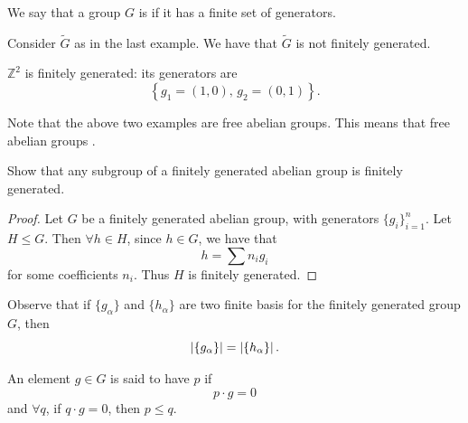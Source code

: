\documentclass[notoc,notitlepage]{tufte-book}
\begin{document}
\begin{defn}\label{defn:finitely_generated}
  We say that a group $G$ is  if it has a finite set
  of generators.
\end{defn}

\begin{eg}
  Consider $\tilde{G}$ as in the last example. We have that $\tilde{G}$ is not
  finitely generated.
\end{eg}

\begin{eg}
  $\mathbb{Z}^2$ is finitely generated: its generators are
  \begin{equation*}
    \left\{ g_1 = (1, 0),\,g_2 = (0, 1) \right\}.
  \end{equation*}
\end{eg}

\begin{note}
  Note that the above two examples are free abelian groups. This means that free
  abelian groups .
\end{note}

\begin{ex}
  Show that any subgroup of a finitely generated abelian group is finitely
  generated.
\end{ex}

\begin{proof}
  Let $G$ be a finitely generated abelian group, with generators $\{ g_i
  \}_{i=1}^{n}$. Let  $H \leq G$. Then $\forall h \in H$, since $h \in G$, we
  have that
  \begin{equation*}
    h = \sum n_i g_i
  \end{equation*}
  for some coefficients $n_i$. Thus $H$ is finitely generated.
\end{proof}

\begin{note}
  Observe that if $\{g_\alpha\}$ and $\{h_\alpha\}$ are two finite basis for the
  finitely generated group $G$, then
  \begin{equation*}
    \left|\{g_\alpha\}\right| = \left|\{h_\alpha\}\right|.
  \end{equation*}
\end{note}

\begin{defn}[Order]\label{defn:order}
  An element $g \in G$ is said to have  $p$ if
  \begin{equation*}
    p \cdot g = 0
  \end{equation*}
  and $\forall q$, if $q \cdot g = 0$, then $p \leq q$.
\end{defn}
\end{document}
